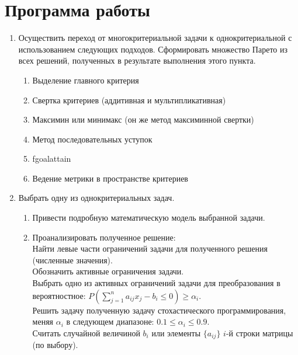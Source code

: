 





\tableofcontents
\newpage

\section{Программа работы}

\begin{enumerate}
	\item Осуществить переход от многокритериальной задачи к однокритериальной с использованием следующих подходов.  Сформировать множество Парето из всех решений, полученных в результате выполнения этого пункта.
		\begin{enumerate}
			\item Выделение главного критерия
			\item Свертка критериев (аддитивная и мультипликативная)
			\item Максимин или минимакс (он же метод максиминной свертки)
			\item Метод последовательных уступок
			\item fgoalattain 
			\item Ведение метрики в пространстве критериев
		\end{enumerate}
	\item Выбрать одну из однокритериальных задач.
		\begin{enumerate}
			\item Привести подробную математическую модель выбранной задачи.
			\item Проанализировать полученное решение:\\
			Найти левые части ограничений задачи для полученного решения (численные значения).\\
			Обозначить активные ограничения задачи.\\
			Выбрать одно из активных ограничений задачи для преобразования в вероятностное: 
			$P\left( \sum_{j=1}^n a_{ij} x_j - b_i \leq 0 \right) \geq \alpha_i$.\\
			Решить задачу полученную задачу стохастического программирования, меняя $\alpha_i$ в следующем диапазоне: $0.1 \leq \alpha_i \leq 0.9$.\\
			Считать случайной величиной $b_i$ или элементы $\{a_{ij}\}$ $i$-й строки матрицы    (по выбору).
		\end{enumerate}
\end{enumerate}


